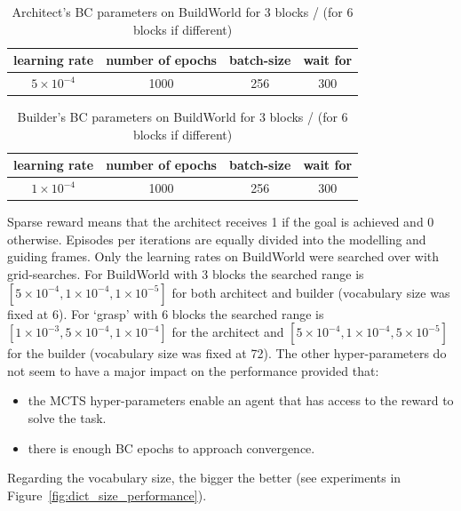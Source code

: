 
\begin{table}[h!]
    \centering
    \begin{tabular}{cccc}
         learning rate & number of epochs  & batch-size & wait for \\
         \hline
         $5\times10^{-4}$ & 1000 & 256 & 300
    \end{tabular}
    \caption{Architect's BC parameters on BuildWorld for 3 blocks / (for 6 blocks if different)}
\end{table}

\begin{table}[h!]
    \centering
    \begin{tabular}{cccc}
         learning rate & number of epochs  & batch-size & wait for \\
         \hline
         $1\times10^{-4}$ & 1000 & 256 & 300
    \end{tabular}
    \caption{Builder's BC parameters on BuildWorld for 3 blocks / (for 6 blocks if different)}
\end{table}
Sparse reward means that the architect receives 1 if the goal is achieved and 0 otherwise. Episodes per iterations are equally divided into the modelling and guiding frames. Only the learning rates on BuildWorld were searched over with grid-searches. For BuildWorld with 3 blocks the searched range is $[ 5\times10^{-4}, 1\times10^{-4}, 1\times10^{-5}]$ for both architect and builder (vocabulary size was fixed at 6). For `grasp' with 6 blocks the searched range is $[ 1\times10^{-3}, 5\times10^{-4}, 1\times10^{-4}]$ for the architect and $[ 5\times10^{-4}, 1\times10^{-4}, 5\times10^{-5}]$ for the builder (vocabulary size was fixed at 72). The other hyper-parameters do not seem to have a major impact on the performance provided that:
\begin{itemize}[noitemsep]
    \item the MCTS hyper-parameters enable an agent that has access to the reward to solve the task.
    \item there is enough BC epochs to approach convergence.
\end{itemize}Regarding the vocabulary size, the bigger the better (see experiments in Figure~\ref{fig:dict_size_performance}). 

